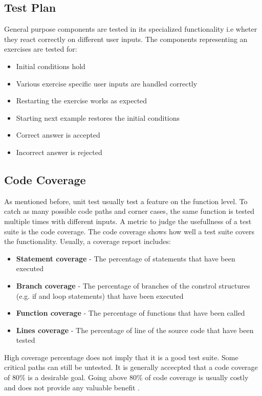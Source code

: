 \subsection*{Test Plan}

General purpose components are tested in its specialized functionality i.e wheter they react correctly on different user inputs. 
The components representing an exercises are tested for:

\begin{itemize}
    \item Initial conditions hold
    \item Various exercise specific user inputs are handled correctly
    \item Restarting the exercise works as expected
    \item Starting next example restores the initial conditions
    \item Correct answer is accepted
    \item Incorrect answer is rejected
\end{itemize}

\subsection*{Code Coverage}
As mentioned before, unit test usually test a feature on the function level. To catch as many possible code paths and corner cases, the same function is tested multiple times with different inputs. 
A metric to judge the usefullness of a test suite is the code coverage. The code coverage shows how well a test suite covers the functionality. Usually, a coverage report includes:

\begin{itemize}
    \item \textbf{Statement coverage} - The percentage of statements that have been executed 
    \item \textbf{Branch coverage} - The percentage of branches of the constrol structures (e.g. if and loop statements) that have been executed
    \item \textbf{Function coverage} - The percentage of functions that have been called
    \item \textbf{Lines coverage} - The percentage of line of the source code that have been tested
\end{itemize}

High coverage percentage does not imply that it is a good test suite. Some critical paths can still be untested. It is generally accecpted that a code coverage of 80\% is a desirable goal. Going above 80\% of code coverage is usually costly and does not provide any valuable benefit \cite{CodeCoverage}.

